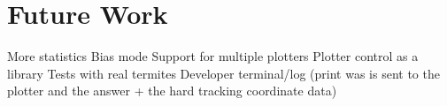 
\section{Future Work}

More statistics
Bias mode
Support for multiple plotters
Plotter control as a library
Tests with real termites
Developer terminal/log (print was is sent to the plotter and the answer + the hard tracking coordinate data)